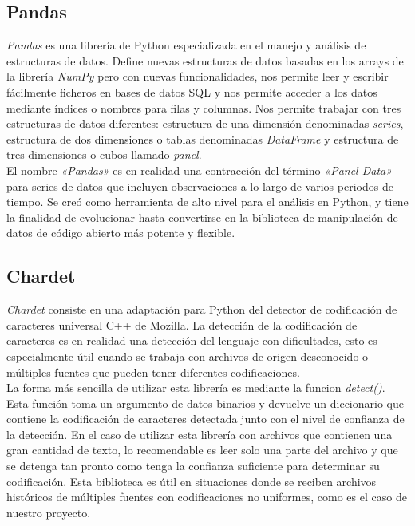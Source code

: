 \documentclass[a4paper, 12pt]{book}
\begin{document}
\subsection{Pandas}
\label{subsec:pandas}
\textit{Pandas} es una librería de Python especializada en el manejo y análisis de estructuras de datos. Define nuevas estructuras de datos basadas en los arrays de la librería \textit{NumPy} pero
con nuevas funcionalidades, nos permite leer y escribir fácilmente ficheros en bases de datos SQL y nos permite acceder a los datos mediante índices o nombres para filas y columnas.
Nos permite trabajar con tres estructuras de datos diferentes: estructura de una dimensión denominadas \textit{series}, estructura de dos dimensiones o tablas denominadas \textit{DataFrame} y estructura
de tres dimensiones o cubos llamado \textit{panel}.
\\El nombre \textit{«Pandas»} es en realidad una contracción del término \textit{«Panel Data»} para series de datos que incluyen observaciones a lo largo de varios periodos de tiempo. Se creó como herramienta
de alto nivel para el análisis en Python, y tiene la finalidad de evolucionar hasta convertirse en la biblioteca de manipulación de datos de código abierto más potente y flexible.

\subsection{Chardet}
\label{subsec:chardet}

\textit{Chardet} consiste en una adaptación para Python del detector de codificación de caracteres universal C++ de Mozilla. La detección de la codificación de caracteres es en realidad una detección del lenguaje
con dificultades, esto es especialmente útil cuando se trabaja con archivos de origen desconocido o múltiples fuentes que pueden tener diferentes codificaciones.
\\La forma más sencilla de utilizar esta librería es mediante la funcion \textit{detect()}. Esta función toma un argumento de datos binarios y devuelve un diccionario que contiene la codificación de caracteres detectada
junto con el nivel de confianza de la detección. En el caso de utilizar esta librería con archivos que contienen una gran cantidad de texto, lo recomendable es leer solo una parte del archivo y que se detenga tan pronto
como tenga la confianza suficiente para determinar su codificación. Esta biblioteca es útil en situaciones donde se reciben archivos históricos de múltiples fuentes con codificaciones no uniformes, como es el caso de nuestro proyecto.
\end{document}
